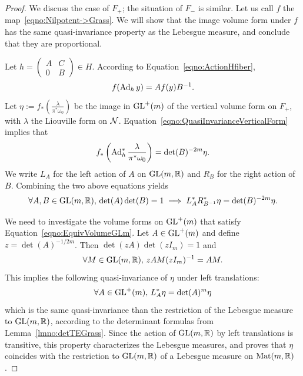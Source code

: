 \documentclass[english]{article}
\begin{document}
\begin{proof}
	We discuss the case of $F_+$; the situation of $F_-$ is similar. Let us call $f$ the map~\eqref{eqno:Nilpotent->Grass}. We will show that the image volume form under $f$ has the same quasi-invariance property as the Lebesgue measure, and conclude that they are proportional.
    
	Let $h=\begin{pmatrix}
								A & C\\
								0 & B
							\end{pmatrix} \in H$.
	According to Equation~\eqref{eqno:ActionHfiber}, 
	\[
		f(\operatorname{Ad}_h y) = A f(y) B^{-1}
	.	\]
	Let $\eta := f_*\left(\frac{\lambda}{\pi^*\omega_0}\right)$ be the image in $\operatorname{GL}^+(m)$ of the vertical volume form on $F_+$, with $\lambda$ the Liouville form on $\mathcal{N}$.
	Equation~\eqref{eqno:QuasiInvarianceVerticalForm} implies that
	\[
	f_*\left(
		\operatorname{Ad}_h^* \frac{\lambda}{\pi^*\omega_0}
		\right) 
		= \det(B)^{-2m} \eta
	.\]
	We write $L_A$ for the left action of $A$ on $\operatorname{GL}(m, \mathbb{R})$ and $R_B$ for the right action of $B$.
	Combining the two above equations yields
	\begin{equation}\label{eqno:EquivVolumeGLm}
		\forall A, B \in \operatorname{GL}(m, \mathbb{R}),\,
		 \det(A)\det(B) = 1 
		\implies 
		L_A^*R_{B^{-1}}^* \eta = \det(B)^{-2m} \eta
	.\end{equation}
	
	We need to investigate the volume forms on $\operatorname{GL}^+(m)$ that satisfy Equation~\eqref{eqno:EquivVolumeGLm}. Let $A\in \operatorname{GL}^+(m)$ and define $z=\det(A)^{-1/2m}$. Then $\det(z A) \det(z I_m) = 1$ and 
	\[
		\forall M \in \operatorname{GL}(m, \mathbb{R}), \,
		zA M (z I_m)^{-1} = A M
	.\]
	This implies the following quasi-invariance of $\eta$ under left translations:
	\[
		\forall A \in \operatorname{GL}^+(m), 
		\,
		L_A^* \eta
		=  \det(A)^{m} \eta
	\]
    which is the same quasi-invariance than the restriction of the Lebesgue measure to $\operatorname{GL}(m, \mathbb{R})$, according to the determinant formulas from Lemma~\ref{lmno:detTEGrass}.
    Since the action of $\operatorname{GL}(m, \mathbb{R})$ by left translations
%
    is transitive, this property characterizes the Lebesgue measures, and proves that $\eta$ coincides with the restriction to $\operatorname{GL}(m, \mathbb{R})$ of a Lebesgue measure on $\operatorname{Mat}(m, \mathbb{R})$.
\end{proof}
\end{document}
